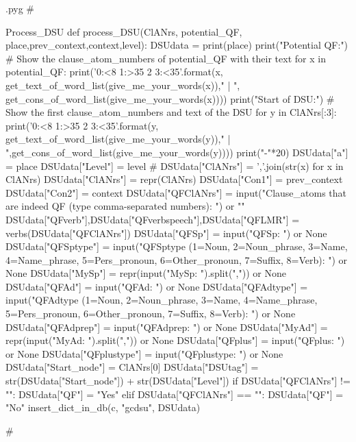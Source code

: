 \documentclass{report}
\makeatletter
\newenvironment{python}{%
  \VerbatimEnvironment
  \minted@resetoptions
  \setkeys{minted@opt}{}
      \begin{VerbatimOut}{\jobname.pyg}}
{%
      \end{VerbatimOut}
      \minted@pygmentize{python}
      \DeleteFile{\jobname.pyg}}
\makeatother
\begin{document}
\begin{python}
#{{{ Process_DSU
def process_DSU(ClANrs, potential_QF, place,prev_context,context,level):
    DSUdata = {}
    print(place)
    print("Potential QF:")  # Show the clause_atom_numbers of potential_QF with their text
    for x in potential_QF:
        print('{0:<8} {1:>35} {2} {3:<35}'.format(x, get_text_of_word_list(give_me_your_words(x))," | ", get_cons_of_word_list(give_me_your_words(x))))
    print("Start of DSU:")  # Show the first clause_atom_numbers and text of the DSU
    for y in ClANrs[:3]:
        print('{0:<8} {1:>35} {2} {3:<35}'.format(y, get_text_of_word_list(give_me_your_words(y))," | ",get_cons_of_word_list(give_me_your_words(y))))
    print("-"*20)
    DSUdata["a"] = place
    DSUdata["Level"] = level
#    DSUdata["ClANrs"] = ','.join(str(x) for x in ClANrs)
    DSUdata["ClANrs"] = repr(ClANrs)
    DSUdata["Con1"] = prev_context
    DSUdata["Con2"] = context
    DSUdata["QFClANrs"] = input("Clause_atoms that are indeed QF (type comma-separated numbers): ") or ""
    DSUdata["QFverb"],DSUdata["QFverbspeech"],DSUdata["QFLMR"] = verbs(DSUdata["QFClANrs"])
    DSUdata["QFSp"] = input("QFSp: ") or None
    DSUdata["QFSptype"] = input("QFSptype (1=Noun, 2=Noun_phrase, 3=Name, 4=Name_phrase, 5=Pers_pronoun, 6=Other_pronoun, 7=Suffix, 8=Verb): ") or None
    DSUdata["MySp"] = repr(input("MySp: ").split(",")) or None
    DSUdata["QFAd"] = input("QFAd: ") or None
    DSUdata["QFAdtype"] = input("QFAdtype (1=Noun, 2=Noun_phrase, 3=Name, 4=Name_phrase, 5=Pers_pronoun, 6=Other_pronoun, 7=Suffix, 8=Verb): ") or None
    DSUdata["QFAdprep"] = input("QFAdprep: ") or None
    DSUdata["MyAd"] = repr(input("MyAd: ").split(",")) or None
    DSUdata["QFplus"] = input("QFplus: ") or None
    DSUdata["QFplustype"] = input("QFplustype: ") or None
    DSUdata["Start_node"] = ClANrs[0]
    DSUdata["DSUtag"] = str(DSUdata["Start_node"]) + str(DSUdata["Level"])
    if DSUdata["QFClANrs"] != "":
        DSUdata["QF"] = "Yes"
    elif DSUdata["QFClANrs"] == "":
        DSUdata["QF"] = "No"
    insert_dict_in_db(c, "gcdsu", DSUdata)

#}}}
\end{python}
\end{document}

